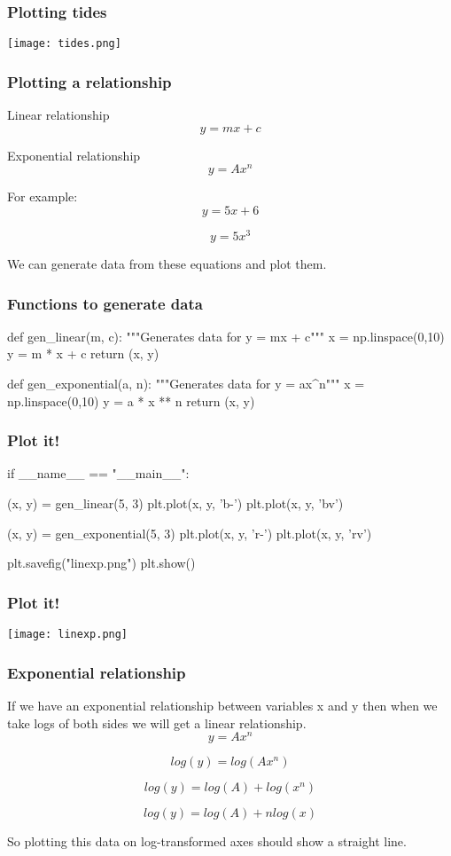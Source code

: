 \documentclass{beamer}
\begin{document}
\begin{frame}[fragile]
\frametitle{Plotting tides}
\texttt{[image: tides.png]}
\end{frame}

\begin{frame}[fragile]
\frametitle{Plotting a relationship}

Linear relationship
\[ y = mx + c \]

Exponential relationship
\[ y = Ax^n \]


For example:
\[y = 5x +6\]

\[y = 5x ^3 \] 

We can generate data from these equations and plot them.
\end{frame}


\begin{frame}[fragile]
\frametitle{Functions to generate data}
\begin{code}
def gen_linear(m, c):
    """Generates data for y = mx + c"""
    x = np.linspace(0,10)
    y = m * x + c
    return (x, y)

def gen_exponential(a, n):
    """Generates data for y = ax^n"""
    x = np.linspace(0,10)
    y = a * x ** n
    return (x, y)
\end{code}

\end{frame}


\begin{frame}[fragile]
\frametitle{Plot it!}
\begin{code}
if __name__ == "__main__":

    (x, y) = gen_linear(5, 3)
    plt.plot(x, y, 'b-')
    plt.plot(x, y, 'bv')

    (x, y) = gen_exponential(5, 3)
    plt.plot(x, y, 'r-')
    plt.plot(x, y, 'rv')

    plt.savefig("linexp.png")
    plt.show()
\end{code}
\end{frame}

\begin{frame}[fragile]
\frametitle{Plot it!}
\texttt{[image: linexp.png]}
\end{frame}

\begin{frame}[fragile]
\frametitle{Exponential relationship}
If we have an exponential relationship between variables x and y then when we take logs of both sides we will get a linear relationship. 
\[ y = Ax^n \]

\[log(y) = log(Ax^n) \]

\[ log(y) = log(A) + log(x^n) \]

\[ log(y) = log(A) + n log(x) \]

So plotting this data on log-transformed axes should show a straight line.

\end{frame}
\end{document}
